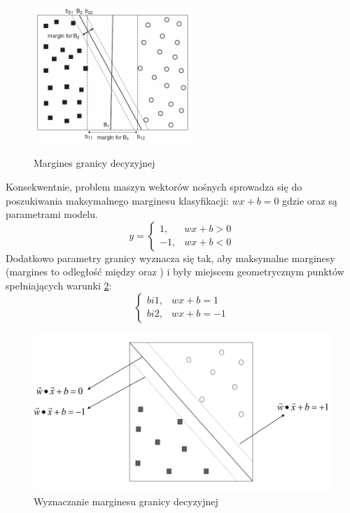 \begin{figure}[H] 
        \centering\includegraphics[width=6cm,height=6cm]{figures/SVM-margin.png}
        \caption{Margines granicy decyzyjnej}\label{SVM-margines}
\end{figure}
Konsekwentnie, problem maszyn wektorów nośnych sprowadza się do poszukiwania maksymalnego marginesu klasyfikacji: $w x + b = 0$ gdzie  oraz  są parametrami modelu.
\[
y = 
    \begin{cases}
            1,&  wx+b > 0\\
            -1,& wx+b < 0
    \end{cases}
\]
Dodatkowo parametry granicy wyznacza się tak, aby maksymalne marginesy (margines to odległość między  oraz )  i  były miejscem geometrycznym punktów  spełniających warunki \ref{SVM-marginesEq}:
\[
    \begin{cases}
            bi1,&  wx+b = 1\\
            bi2,& wx+b= -1
    \end{cases}
\]
\begin{figure}[H] 
        \centering\includegraphics[width=14cm,height=6cm]{figures/SVM-marginEq.png}
        \caption{Wyznaczanie marginesu granicy decyzyjnej}\label{SVM-marginesEq}
\end{figure}

